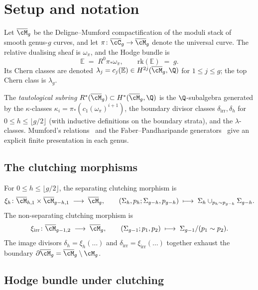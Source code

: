 \section{Setup and notation}
\label{sec:clutching-setup}

Let $\overline{\cM}_g$ be the Deligne--Mumford compactification of the
moduli stack of smooth genus-$g$ curves, and let
$\pi\colon \overline{\cC}_g \to \overline{\cM}_g$ denote the universal
curve. The relative dualising sheaf is $\omega_\pi$, and the Hodge
bundle is
\[
\mathbb{E} \;=\; R^0\pi_* \omega_\pi,
\qquad
\mathrm{rk}(\mathbb{E}) \;=\; g.
\]
Its Chern classes are denoted
$\lambda_j = c_j(\mathbb{E}) \in H^{2j}(\overline{\cM}_g, \Q)$ for
$1 \leq j \leq g$; the top Chern class is $\lambda_g$.

The \emph{tautological subring}
$R^*(\overline{\cM}_g) \subset H^*(\overline{\cM}_g, \Q)$ is the
$\Q$-subalgebra generated by the $\kappa$-classes
$\kappa_i = \pi_*(c_1(\omega_\pi)^{i+1})$, the boundary divisor classes
$\delta_{\mathrm{irr}}, \delta_h$ for $0 \leq h \leq \lfloor g/2 \rfloor$
(with inductive definitions on the boundary strata), and the
$\lambda$-classes. Mumford's relations~\cite{Mumford83} and the
Faber--Pandharipande generators~\cite{FP00} give an explicit finite
presentation in each genus.

\subsection{The clutching morphisms}
\label{subsec:clutching-morphisms}

For $0 \leq h \leq \lfloor g/2 \rfloor$, the separating clutching
morphism is
\[
\xi_h\colon \overline{\cM}_{h,1} \times \overline{\cM}_{g-h,1}
\;\longrightarrow\;
\overline{\cM}_g,
\qquad
(\Sigma_h, p_h; \Sigma_{g-h}, p_{g-h})
\;\longmapsto\;
\Sigma_h \cup_{p_h \sim p_{g-h}} \Sigma_{g-h}.
\]
The non-separating clutching morphism is
\[
\xi_{\mathrm{irr}}\colon \overline{\cM}_{g-1,2}
\;\longrightarrow\;
\overline{\cM}_g,
\qquad
(\Sigma_{g-1}; p_1, p_2)
\;\longmapsto\;
\Sigma_{g-1}/(p_1 \sim p_2).
\]
The image divisors $\delta_h = \xi_h(\ldots)$ and
$\delta_{\mathrm{irr}} = \xi_{\mathrm{irr}}(\ldots)$ together exhaust
the boundary
$\partial \overline{\cM}_g = \overline{\cM}_g \setminus \cM_g$.

\subsection{Hodge bundle under clutching}
\label{subsec:hodge-clutching}

